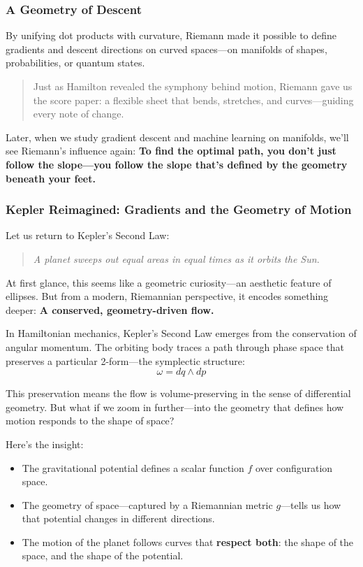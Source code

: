 \subsubsection*{A Geometry of Descent}

By unifying dot products with curvature, Riemann made it possible to define gradients and descent directions on curved spaces—on manifolds of shapes, probabilities, or quantum states.

\begin{quote}
Just as Hamilton revealed the symphony behind motion,  
Riemann gave us the score paper: a flexible sheet that bends, stretches, and curves—guiding every note of change.
\end{quote}

Later, when we study gradient descent and machine learning on manifolds, we’ll see Riemann’s influence again:  
\textbf{To find the optimal path, you don’t just follow the slope—you follow the slope that’s defined by the geometry beneath your feet.}


\subsubsection*{Kepler Reimagined: Gradients and the Geometry of Motion}

Let us return to Kepler’s Second Law:

\begin{quote}
\textit{A planet sweeps out equal areas in equal times as it orbits the Sun.}
\end{quote}

At first glance, this seems like a geometric curiosity—an aesthetic feature of ellipses.  
But from a modern, Riemannian perspective, it encodes something deeper:  
\textbf{A conserved, geometry-driven flow.}

In Hamiltonian mechanics, Kepler’s Second Law emerges from the conservation of angular momentum. The orbiting body traces a path through phase space that preserves a particular 2-form—the symplectic structure:
\[
\omega = dq \wedge dp
\]

This preservation means the flow is volume-preserving in the sense of differential geometry. But what if we zoom in further—into the geometry that defines how motion responds to the shape of space?

Here’s the insight:

\begin{itemize}
  \item The gravitational potential defines a scalar function \( f \) over configuration space.
  \item The geometry of space—captured by a Riemannian metric \( g \)—tells us how that potential changes in different directions.
  \item The motion of the planet follows curves that \textbf{respect both}: the shape of the space, and the shape of the potential.
\end{itemize}

